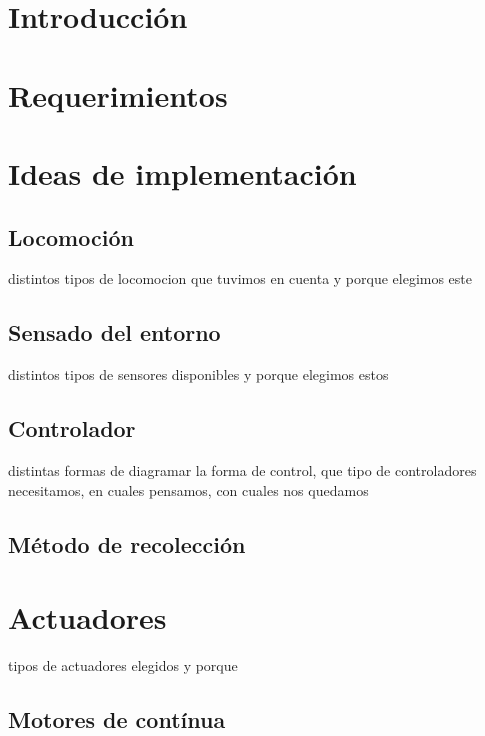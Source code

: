 \section{Introducci\'on}
\label{}

\section{Requerimientos}
\label{}

\section{Ideas de implementaci\'on}
\label{}

\subsection{Locomoci\'on}
\label{}

distintos tipos de locomocion que tuvimos en cuenta y porque elegimos este

\subsection{Sensado del entorno}
\label{}

distintos tipos de sensores disponibles y porque elegimos estos

\subsection{Controlador}
\label{}

distintas formas de diagramar la forma de control, que tipo de controladores necesitamos, en cuales pensamos, con cuales nos quedamos

\subsection{M\'etodo de recolecci\'on}
\label{}

\section{Actuadores}
\label{}

tipos de actuadores elegidos y porque

\subsection{Motores de cont\'inua}
\label{}

